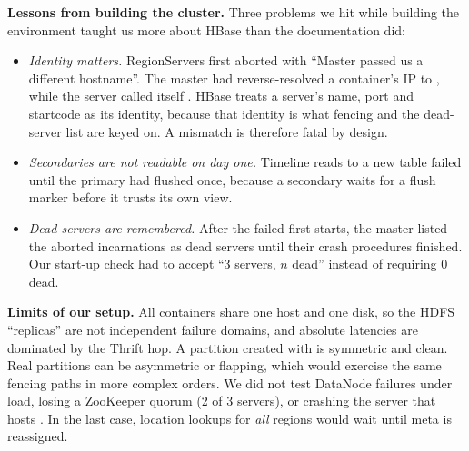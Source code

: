 \textbf{Lessons from building the cluster.} Three problems we hit while building the environment taught us more about HBase than the documentation did:
\begin{itemize}
\item \emph{Identity matters.} RegionServers first aborted with ``Master passed us a different hostname''. The master had reverse-resolved a container's IP to , while the server called itself . HBase treats a server's name, port and startcode as its identity, because that identity is what fencing and the dead-server list are keyed on. A mismatch is therefore fatal by design.
\item \emph{Secondaries are not readable on day one.} Timeline reads to a new table failed until the primary had flushed once, because a secondary waits for a flush marker before it trusts its own view.
\item \emph{Dead servers are remembered.} After the failed first starts, the master listed the aborted incarnations as dead servers until their crash procedures finished. Our start-up check had to accept ``3 servers, $n$ dead'' instead of requiring 0 dead.
\end{itemize}

\textbf{Limits of our setup.} All containers share one host and one disk, so the HDFS ``replicas'' are not independent failure domains, and absolute latencies are dominated by the Thrift hop. A partition created with  is symmetric and clean. Real partitions can be asymmetric or flapping, which would exercise the same fencing paths in more complex orders. We did not test DataNode failures under load, losing a ZooKeeper quorum (2 of 3 servers), or crashing the server that hosts . In the last case, location lookups for \emph{all} regions would wait until meta is reassigned.
